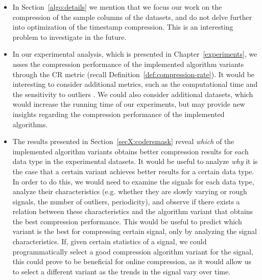 \begin{itemize}

\item In Section~\ref{algo:details} we mention that we focus our work on the compression of the sample columns of the datasets, and do not delve further into optimization of the timestamp compression. This is an interesting problem to investigate in the future.

\item In our experimental analysis, which is presented in Chapter~\ref{experiments}, we asses the compression performance of the implemented algorithm variants through the CR metric (recall Definition~\ref{def:compression-rate}). It would be interesting to consider additional metrics, such as the computational time and the sensitivity to outliers \cite{AnEva2013}. We could also consider additional datasets, which would increase the running time of our experiments, but may provide new insights regarding the compression performance of the implemented algorithms.

\item The results presented in Section~\ref{secX:codersmask} reveal \textit{which} of the implemented algorithm variants obtains better compression results for each data type in the experimental datasets. It would be useful to analyze \textit{why} it is the case that a certain variant achieves better results for a certain data type. In order to do this, we would need to examine the signals for each data type, analyze their characteristics (e.g. whether they are slowly varying or rough signals, the number of outliers, periodicity), and observe if there exists a relation between these characteristics and the algorithm variant that obtains the best compression performance. This would be useful to predict which variant is the best for compressing certain signal, only by analyzing the signal characteristics. If, given certain statistics of a signal, we could programmatically select a good compression algorithm variant for the signal, this could prove to be beneficial for online compression, as it would allow us to select a different variant as the trends in the signal vary over time.

\end{itemize}

